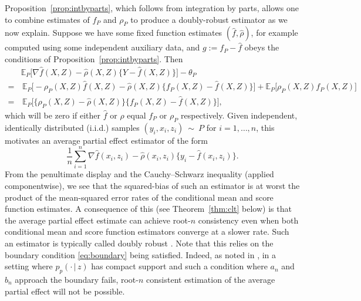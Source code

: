 \documentclass[aos]{imsart}
\newcommand{\E}{\mathbb{E}}
\newcommand{\given}{\,|\,}
\begin{document}
	Proposition~\ref{prop:intbyparts}, which follows from integration by parts, allows one to combine estimates of $f_P$ and $\rho_P$ to produce a doubly-robust estimator as we now explain. Suppose we have some fixed function estimates $(\hat f,\hat\rho)$, for example computed using some independent auxiliary data, and $g := f_P - \hat f$ obeys the conditions of Proposition~\ref{prop:intbyparts}. Then 
	\begin{equation*} %
		\begin{split}
	&	\E_P\big[\nabla \hat f(X,Z) - \hat\rho(X,Z)\big\{Y-\hat f(X,Z)\big\}\big] - \theta_P \\
	=&\, \E_P\big[ - \rho_P(X, Z) \hat{f}(X, Z)  - \hat\rho(X,Z)\big\{f_P(X, Z)-\hat f(X,Z)\big\}\big] + \E_P \big[ \rho_P(X, Z)f_P(X, Z)  \big] \\
= &\, \E_P\big[\big\{\rho_P(X,Z)-\hat\rho(X,Z)\big\}\big\{f_P(X,Z)-\hat f(X,Z)\big\}\big],
		\end{split}
	\end{equation*}
which will be zero if either $\hat{f}$ or $\hat\rho$ equal $f_P$ or $\rho_P$ respectively.
	Given independent, identically distributed (i.i.d.) samples $(y_i,x_i,z_i)~\sim~P$ for $i=1,\ldots,n$, this motivates an average partial effect estimator  of the form
	\begin{equation*} 
		\frac1n \sum_{i=1}^n \nabla \hat f(x_i,z_i) - \hat\rho(x_i,z_i)\big\{y_i-\hat f(x_i,z_i)\big\}.
	\end{equation*}
	From the penultimate display %
	and the Cauchy--Schwarz inequality (applied componentwise), we see that the squared-bias of such an estimator is at worst the product of the mean-squared error rates of the conditional mean and score function estimates. A consequence of this (see Theorem~\ref{thm:clt} below) is that the average partial effect estimate can achieve root-$n$ consistency even when both conditional mean and score function estimators converge at a slower rate. Such an estimator is typically called doubly robust \citep{SRR99, RobinsCommentMurphy, RobinsCommentBickel}.
	Note that this relies on the boundary condition \eqref{eq:boundary} being satisfied. Indeed, as noted in \citet{NeweyEfficiency}, in a setting where $p_p(\cdot \given z)$ has compact support and such a condition where $a_n$ and $b_n$ approach the boundary fails, root-$n$ consistent estimation of the average partial effect will not be possible.
	
\end{document}
